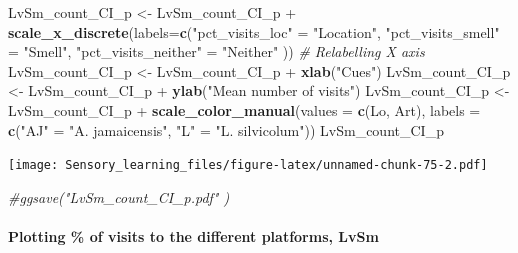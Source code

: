 \documentclass[]{article}
\newenvironment{Shaded}{\begin{snugshade}}{\end{snugshade}}
\newcommand{\KeywordTok}[1]{\textcolor[rgb]{0.13,0.29,0.53}{\textbf{{#1}}}}
\newcommand{\DataTypeTok}[1]{\textcolor[rgb]{0.13,0.29,0.53}{{#1}}}
\newcommand{\StringTok}[1]{\textcolor[rgb]{0.31,0.60,0.02}{{#1}}}
\newcommand{\CommentTok}[1]{\textcolor[rgb]{0.56,0.35,0.01}{\textit{{#1}}}}
\newcommand{\NormalTok}[1]{{#1}}
\let\oldparagraph\paragraph
\renewcommand{\paragraph}[1]{\oldparagraph{#1}\mbox{}}
\begin{document}
\begin{Shaded}
\begin{Highlighting}[]
\NormalTok{LvSm_count_CI_p <-}\StringTok{ }\NormalTok{LvSm_count_CI_p +}\StringTok{ }\KeywordTok{scale_x_discrete}\NormalTok{(}\DataTypeTok{labels=}\KeywordTok{c}\NormalTok{(}\StringTok{"pct_visits_loc"} \NormalTok{=}\StringTok{ "Location"}\NormalTok{, }\StringTok{"pct_visits_smell"} \NormalTok{=}\StringTok{ "Smell"}\NormalTok{,}
                              \StringTok{"pct_visits_neither"} \NormalTok{=}\StringTok{ "Neither"} \NormalTok{))  }\CommentTok{# Relabelling X axis}
\NormalTok{LvSm_count_CI_p <-}\StringTok{ }\NormalTok{LvSm_count_CI_p +}\StringTok{ }\KeywordTok{xlab}\NormalTok{(}\StringTok{"Cues"}\NormalTok{)}
\NormalTok{LvSm_count_CI_p <-}\StringTok{ }\NormalTok{LvSm_count_CI_p +}\StringTok{ }\KeywordTok{ylab}\NormalTok{(}\StringTok{"Mean number of visits"}\NormalTok{)}
\NormalTok{LvSm_count_CI_p <-}\StringTok{ }\NormalTok{LvSm_count_CI_p +}\StringTok{ }\KeywordTok{scale_color_manual}\NormalTok{(}\DataTypeTok{values =} \KeywordTok{c}\NormalTok{(Lo, Art), }\DataTypeTok{labels =} \KeywordTok{c}\NormalTok{(}\StringTok{"AJ"} \NormalTok{=}\StringTok{ "A. jamaicensis"}\NormalTok{, }\StringTok{"L"} \NormalTok{=}\StringTok{ "L. silvicolum"}\NormalTok{))}
\NormalTok{LvSm_count_CI_p }
\end{Highlighting}
\end{Shaded}

\texttt{[image: Sensory\_learning\_files/figure-latex/unnamed-chunk-75-2.pdf]}

\begin{Shaded}
\begin{Highlighting}[]
\CommentTok{#ggsave("LvSm_count_CI_p.pdf"  )}
\end{Highlighting}
\end{Shaded}

\paragraph{Plotting \% of visits to the different platforms,
LvSm}\label{plotting-of-visits-to-the-different-platforms-lvsm-1}
\end{document}
